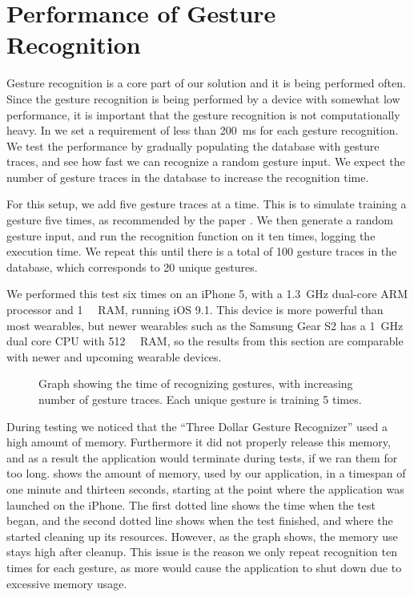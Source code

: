 \section{Performance of Gesture Recognition}\label{sec:gestureperformance}
Gesture recognition is a core part of our solution and it is being performed often. 
Since the gesture recognition is being performed by a device with somewhat low performance,
it is important that the gesture recognition is not computationally heavy.
In  we set a requirement of less than \SI{200}{\milli\second} for each gesture recognition.
We test the performance by gradually populating the database with gesture traces, 
and see how fast we can recognize a random gesture input.
We expect the number of gesture traces in the database to increase the recognition time.

For this setup, we add five gesture traces at a time. 
This is to simulate training a gesture five times, 
as recommended by the \threedollar paper \cite{threedollar}. 
We then generate a random gesture input, 
and run the recognition function on it ten times, 
logging the execution time.
We repeat this until there is a total of \num{100} gesture traces in the database, 
which corresponds to \num{20} unique gestures.

We performed this test six times on an iPhone 5, 
with a \SI{1.3}{\giga\hertz} dual-core ARM processor and \SI{1}{\giga\byte} RAM, running iOS 9.1.
This device is more powerful than most wearables, 
but newer wearables such as the Samsung Gear S2 has a \SI{1}{\giga\hertz} dual core CPU with \SI{512}{\mega\byte} RAM, 
so the results from this section are comparable with newer and upcoming wearable devices.

\begin{figure}[!htb]
    \centering
    
    \caption{Graph showing the time of recognizing gestures, with increasing number of gesture traces. Each unique gesture is training \num{5} times.}
    \label{fig:performancegraph}
\end{figure}

During testing we noticed that the ``Three Dollar Gesture Recognizer'' used a high amount of memory. 
Furthermore it did not properly release this memory, 
and as a result the application would terminate during tests, 
if we ran them for too long.
 shows the amount of memory, 
used by our application, 
in a timespan of one minute and thirteen seconds, 
starting at the point where the application was launched on the iPhone. 
The first dotted line shows the time when the test began, 
and the second dotted line shows when the test finished, 
and where the \threedollar started cleaning up its resources.
However, as the graph shows, the memory use stays high after cleanup. %
This issue is the reason we only repeat recognition ten times for each gesture, 
as more would cause the application to shut down due to excessive memory usage. %

